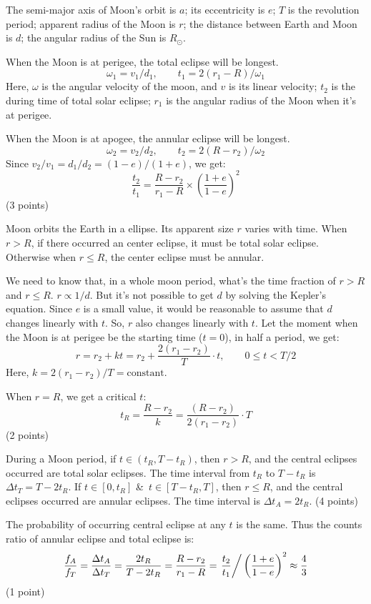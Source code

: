 The semi-major axis of Moon's orbit is $a$; its eccentricity is $e$; $T$ is
the revolution period; apparent radius of the Moon is $r$; the distance
between Earth and Moon is $d$; the angular radius of the Sun is $R_\odot$.

When the Moon is at perigee, the total eclipse will be longest.
\[
\omega_1 = v_1/d_1, \qquad t_1 = 2(r_1 - R)/\omega_1
\]
Here, $\omega$ is the angular velocity of the moon, and $v$ is its linear
velocity; $t_2$ is the during time of total solar eclipse; $r_1$ is the
angular radius of the Moon when it's at perigee.

When the Moon is at apogee, the annular eclipse will be longest.
\[
\omega_2 = v_2/d_2, \qquad t_2 = 2(R - r_2)/\omega_2
\]
Since $v_2/v_1 = d_1/d_2 = (1-e)/(1+e)$, we get:
\begin{equation}
\frac{t_2}{t_1} = \frac{R-r_2}{r_1-R}\times\left(\frac{1+e}{1-e}\right)^2
\tag{1}
\end{equation}
\hfill(3 points)

Moon orbits the Earth in a ellipse. Its apparent size $r$ varies with time.
When $r > R$, if there occurred an center eclipse, it must be total solar
eclipse. Otherwise when $r \le R$, the center eclipse must be annular.

We need to know that, in a whole moon period, what's the time fraction of
$r > R$ and $r \le R$. $r \propto 1/d$. But it's not possible to get $d$ by
solving the Kepler's equation. Since $e$ is a small value, it would be
reasonable to assume that $d$ changes linearly with $t$. So, $r$ also changes
linearly with $t$. Let the moment when the Moon is at perigee be the starting
time ($t=0$), in half a period, we get:
\[
r = r_2 + kt = r_2 + \frac{2(r_1-r_2)}{T}\cdot t, \qquad 0 \le t < T/2
\]
Here, $k = 2(r_1-r_2)/T = \mathrm{constant}$.

When $r = R$, we get a critical $t$:
\begin{equation}
t_R = \frac{R-r_2}{k} = \frac{(R-r_2)}{2(r_1-r_2)}\cdot T
\tag{2}
\end{equation}
\hfill(2 points)

During a Moon period, if $t \in (t_R, T-t_R)$, then $r > R$, and the central
eclipses occurred are total solar eclipses. The time interval from $t_R$ to
$T-t_R$ is $\Delta t_T = T - 2t_R$. If $t \in [0, t_R]$ \&\ $t \in [T-t_R, T]$,
then $r \le R$, and the central eclipses occurred are annular eclipses. The
time interval is $\Delta t_A = 2t_R$.
\hfill(4 points)

The probability of occurring central eclipse at any $t$ is the same. Thus the
counts ratio of annular eclipse and total eclipse is:
\[
\frac{f_A}{f_T} = \frac{\Delta t_A}{\Delta t_T} = \frac{2t_R}{T-2t_R}
 = \frac{R-r_2}{r_1-R}
 = \left.\frac{t_2}{t_1}\right/\left(\frac{1+e}{1-e}\right)^2
 \approx \frac{4}{3}
\]
\hfill(1 point)
